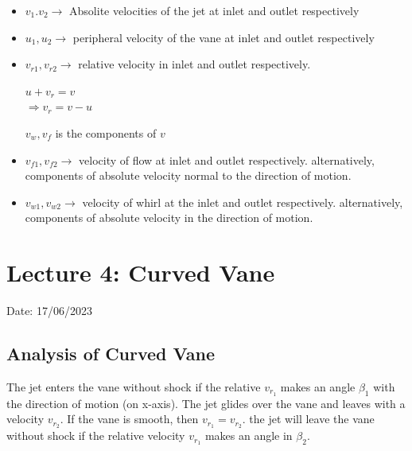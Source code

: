 \documentclass{article}
\begin{document}
\begin{itemize}
  \item $v_1. v_2 \rightarrow $ Absolite velocities of the jet at inlet and outlet respectively
  \item $u_1, u_2 \rightarrow $ peripheral velocity of the vane at inlet and outlet respectively
  \item $v_{r1},v_{r2} \rightarrow $ relative velocity in inlet and outlet respectively.\\

  \begin{minipage}{0.20\textwidth}
    \begin{tcolorbox}[boxrule=1pt,width=\linewidth]
    $u + v_r = v$ \\
    $\Rightarrow v_r = v - u$ 
    \end{tcolorbox}
  \end{minipage}
  \begin{minipage}{0.33\textwidth}
    \begin{tcolorbox}[boxrule=1pt,width=\linewidth]
    $v_w, v_f$ is the components of $v$
    \end{tcolorbox}
  \end{minipage}

  \item $v_{f1}, v_{f2} \rightarrow $ velocity of flow at inlet and outlet respectively. alternatively, components of absolute velocity normal to the direction of motion.
  \item $v_{w1}, v_{w2} \rightarrow $ velocity of whirl at the inlet and outlet respectively. alternatively, components of absolute velocity in the direction of motion.  
\end{itemize}

\section{Lecture 4: Curved Vane}
\hfill Date: 17/06/2023

\subsection{Analysis of Curved Vane}
The jet enters the vane without shock if the relative $v_{r_1}$ makes an angle $\beta_1$ with the direction of motion (on x-axis). The jet glides over the vane and leaves with a velocity $v_{r_2}$. If the vane is smooth, then $v_{r_1} = v_{r_2}$. the jet will leave the vane without shock if the relative velocity $v_{r_1}$ makes an angle in $\beta_2$. \\
\end{document}
